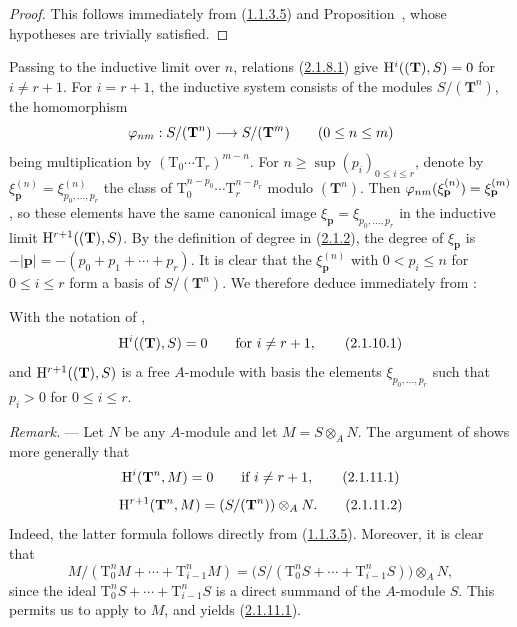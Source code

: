 \begin{proof}
This follows immediately from (\hyperref[III.1.1.3.5]{1.1.3.5}) and Proposition~, whose hypotheses are trivially satisfied.
\end{proof}

\begin{env}[2.1.9]
\label{III.2.1.9}
Passing to the inductive limit over $n$, relations (\hyperref[III.2.1.8.1]{2.1.8.1}) give $\mathrm{H}^i((\mathbf{T}),S)=0$ for $i\neq r+1$.
For $i=r+1$, the inductive system consists of the modules $S/(\mathbf{T}^n)$, the homomorphism
\[
  \varphi_{nm}:S/(\mathbf{T}^n)\longrightarrow S/(\mathbf{T}^m)
  \qquad (0\leq n\leq m)
\]
being multiplication by $(\mathrm{T}_0\cdots\mathrm{T}_r)^{m-n}$.
For $n\geq\sup(p_i)_{0\leq i\leq r}$, denote by $\xi_{\mathbf{p}}^{(n)}=\xi_{p_0,\dots,p_r}^{(n)}$ the class of $\mathrm{T}_0^{n-p_0}\cdots\mathrm{T}_r^{n-p_r}$ modulo $(\mathbf{T}^n)$.
Then $\varphi_{nm}(\xi_{\mathbf{p}}^{(n)})=\xi_{\mathbf{p}}^{(m)}$, so these elements have the same canonical image $\xi_{\mathbf{p}}=\xi_{p_0,\dots,p_r}$ in the inductive limit $\mathrm{H}^{r+1}((\mathbf{T}),S)$.
By the definition of degree in (\hyperref[III.2.1.2]{2.1.2}), the degree of $\xi_{\mathbf{p}}$ is $-|\mathbf{p}|=-(p_0+p_1+\cdots+p_r)$.
It is clear that the $\xi_{\mathbf{p}}^{(n)}$ with $0<p_i\leq n$ for $0\leq i\leq r$ form a basis of $S/(\mathbf{T}^n)$.
We therefore deduce immediately from :
\end{env}

\begin{corollary}[2.1.10]
\label{III.2.1.10}
With the notation of ,
\[
\label{III.2.1.10.1}
  \mathrm{H}^i((\mathbf{T}),S)=0
  \qquad\text{for }i\neq r+1,
  \tag{2.1.10.1}
\]
and $\mathrm{H}^{r+1}((\mathbf{T}),S)$ is a free $A$-module with basis the elements $\xi_{p_0,\dots,p_r}$ such that $p_i>0$ for $0\leq i\leq r$.
\end{corollary}

\begin{env}[2.1.11]
\label{III.2.1.11}
\emph{Remark.} ---
Let $N$ be any $A$-module and let $M=S\otimes_A N$.
The argument of  shows more generally that
\[
\label{III.2.1.11.1}
  \mathrm{H}^i(\mathbf{T}^n,M)=0
  \qquad\text{if }i\neq r+1,
  \tag{2.1.11.1}
\]
\[
\label{III.2.1.11.2}
  \mathrm{H}^{r+1}(\mathbf{T}^n,M)=(S/(\mathbf{T}^n))\otimes_A N.
  \tag{2.1.11.2}
\]
Indeed, the latter formula follows directly from (\hyperref[III.1.1.3.5]{1.1.3.5}).
Moreover, it is clear that
\[
  M/(\mathrm{T}_0^nM+\cdots+\mathrm{T}_{i-1}^nM)
  =\bigl(S/(\mathrm{T}_0^nS+\cdots+\mathrm{T}_{i-1}^nS)\bigr)\otimes_A N,
\]
since the ideal $\mathrm{T}_0^nS+\cdots+\mathrm{T}_{i-1}^nS$ is a direct summand of the $A$-module $S$.
This permits us to apply  to $M$, and yields (\hyperref[III.2.1.11.1]{2.1.11.1}).
\end{env}

